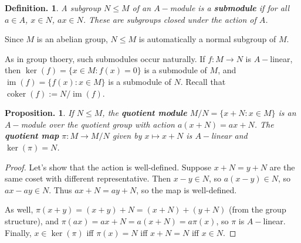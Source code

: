 \documentclass[11pt, a4paper]{memoir}
\theoremstyle{change}
\newtheorem{proposition}[theorem]{Proposition.}
\theoremstyle{plain}
\theoremstyle{nonumberplain}
\newtheorem{definition}{Definition.}
\newtheorem{proof}{Proof}
\DeclareMathOperator{\coker}{coker}
\DeclareMathOperator{\im}{im}
\numberwithin{equation}{section}
\begin{document}
\begin{definition}
    A subgroup $N\leq M$ of an $A-$module is a \textbf{submodule} if for all $a\in A$, $x\in N$, $ax\in N$.
    These are subgroups closed under the action of $A$.
\end{definition}
Since $M$ is an abelian group, $N\leq M$ is automatically a normal subgroup of $M$.

As in group thoery, such submodules occur naturally.
If $f:M\to N$ is $A-$linear, then $\ker(f)=\{x\in M:f(x)=0\}$ is a submodule of $M$, and $\im(f)=\{f(x):x\in M\}$ is a submodule of $N$.
Recall that $\coker(f):= N/\im(f)$.
\begin{proposition}
    If $N\leq M$, the \textbf{quotient module} $M/N=\{x+N:x\in M\}$ is an $A-$module over the quotient group with action $a(x+N)=ax+N$.
    The \textbf{quotient map} $\pi:M\to M/N$ given by $x\mapsto x+N$ is $A-$linear and $\ker(\pi)=N$.
\end{proposition}
\begin{proof}
    Let's show that the action is well-defined.
    Suppose $x+N=y+N$ are the same coset with different representative.
    Then $x-y\in N$, so $a(x-y)\in N$, so $ax-ay\in N$.
    Thus $ax+N=ay+N$, so the map is well-defined.

    As well, $\pi(x+y)=(x+y)+N=(x+N)+(y+N)$ (from the group structure), and $\pi(ax)=ax+N=a(x+N)=a\pi(x)$, so $\pi$ is $A-$linear.
    Finally, $x\in\ker(\pi)$ iff $\pi(x)=N$ iff $x+N=N$ iff $x\in N$.
\end{proof}
\end{document}
